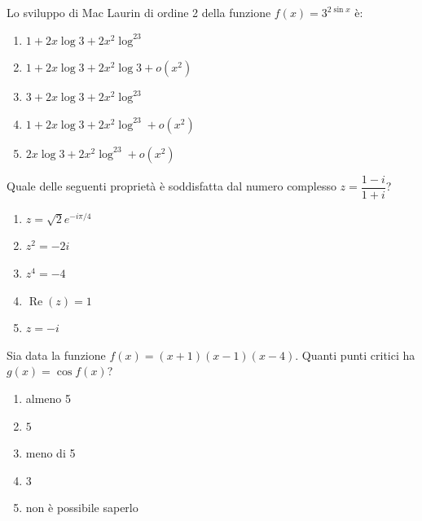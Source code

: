 \begin{quiz}
Lo sviluppo di Mac Laurin di ordine 2 della funzione $f(x)=3^{2\sin x}$ \`e:
\begin{enumerate}[label=\alph*),leftmargin=1.3cm,itemsep=3pt,topsep=5pt]
\item $1+2x\log3+2x^2\log^23$
\item $1+2x\log3+2x^2\log3+o(x^2)$
\item $3+2x\log3+2x^2\log^23$
\item $1+2x\log3+2x^2\log^23+o(x^2)$
\item $2x\log3+2x^2\log^23+o(x^2)$
\end{enumerate}
\end{quiz}

\begin{quiz}
Quale delle seguenti propriet\`a \`e soddisfatta dal numero complesso $z=\dfrac{1-i}{1+i}$?
\begin{enumerate}[label=\alph*),leftmargin=1.3cm,itemsep=3pt,topsep=5pt]
\item $z=\sqrt2e^{-i\pi/4}$
\item $z^2=-2i$
\item $z^4=-4$
\item $\operatorname{Re}(z)=1$
\item $z=-i$
\end{enumerate}
\end{quiz}

\begin{quiz}
Sia data la funzione $f(x)=(x+1)(x-1)(x-4)$. Quanti punti critici ha $g(x)=\cos f(x)$?
\begin{enumerate}[label=\alph*),leftmargin=1.3cm,itemsep=3pt,topsep=5pt]
\item almeno 5
\item $5$
\item meno di 5
\item $3$
\item non \`e possibile saperlo
\end{enumerate}
\end{quiz}


